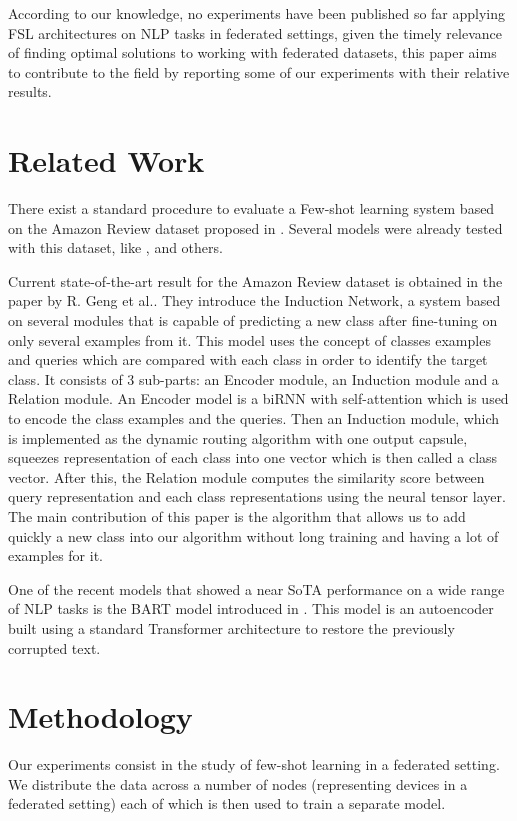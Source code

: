 \documentclass{esannV2}
\begin{document}
According to our knowledge, no experiments have been published so far applying FSL architectures on NLP tasks in federated settings, given the timely relevance of finding optimal solutions to working with federated datasets, this paper aims to contribute to the field by reporting some of our experiments with their relative results.




\section{Related Work}
There exist a standard procedure to evaluate a Few-shot learning system based on the Amazon Review dataset proposed in \cite{yu2018diverse}. Several models were already tested with this dataset, like \cite{yu2018diverse}, \cite{mishra2018simple} and others.

Current state-of-the-art result for the Amazon Review dataset is obtained in the paper by R. Geng et al.\cite{geng-etal-2019-induction}. They introduce the Induction Network, a system based on several modules that is capable of predicting a new class after fine-tuning on only several examples from it. This model uses the concept of classes examples and queries which are compared with each class in order to identify the target class. It consists of 3 sub-parts: an Encoder module, an Induction module and a Relation module. An Encoder model is a biRNN with self-attention which is used to encode the class examples and the queries. Then an Induction module, which is implemented as the dynamic routing algorithm with one output capsule, squeezes representation of each class into one vector which is then called a class vector. After this, the Relation module computes the similarity score between query representation and each class representations using the neural tensor layer. The main contribution of this paper is the algorithm that allows us to add quickly a new class into our algorithm without long training and having a lot of examples for it.

One of the recent models that showed a near SoTA performance on a wide range of NLP tasks is the BART model introduced in \cite{lewis2019bart}. This model is an autoencoder built using a standard Transformer architecture to restore the previously corrupted text. 




\section{Methodology}
Our experiments consist in the study of few-shot learning in a federated setting. We distribute the data across a number of nodes (representing devices in a federated setting) each of which is then used to train a separate model.
\end{document}
